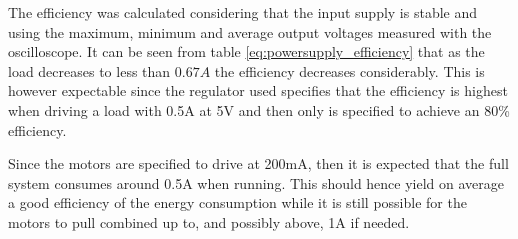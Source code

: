 The efficiency was calculated considering that the input supply is stable and using the maximum, minimum and average output voltages measured with the oscilloscope.
It can be seen from table \ref{eq:powersupply_efficiency} that as the load decreases to less than $0.67A$ the efficiency decreases considerably.
This is however expectable since the regulator used specifies that the efficiency is highest when driving a load with 0.5A at 5V and then only is specified to achieve an 80\% efficiency.

Since the motors are specified to drive at 200mA, then it is expected that the full system consumes around 0.5A when running.
This should hence yield on average a good efficiency of the energy consumption while it is still possible for the motors to pull combined up to, and possibly above, 1A if needed.


